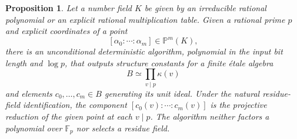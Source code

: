 \documentclass[11pt]{article}
\newtheorem{proposition}[theorem]{Proposition}
\theoremstyle{definition}
\theoremstyle{remark}
\begin{document}
\begin{proposition}\label{prop:kummer-simultaneous-projective-reduction}
Let a number field \(K\) be given by an irreducible rational
polynomial or an explicit rational multiplication table. Given a
rational prime \(p\) and explicit coordinates of a point
\[
 [\alpha_0:\cdots:\alpha_m]\in\mathbb P^m(K),
\]
there is an unconditional deterministic algorithm, polynomial in
the input bit length and \(\log p\), that outputs structure
constants for a finite \'etale algebra
\[
 B\simeq\prod_{v\mid p}\kappa(v)
\]
and elements \(c_0,\ldots,c_m\in B\) generating its unit ideal.
Under the natural residue-field identification, the component
\([c_0(v):\cdots:c_m(v)]\) is the projective reduction of the
given point at each \(v\mid p\). The algorithm neither factors
a polynomial over \(\mathbb F_p\) nor selects a residue field.
\end{proposition}
\end{document}
